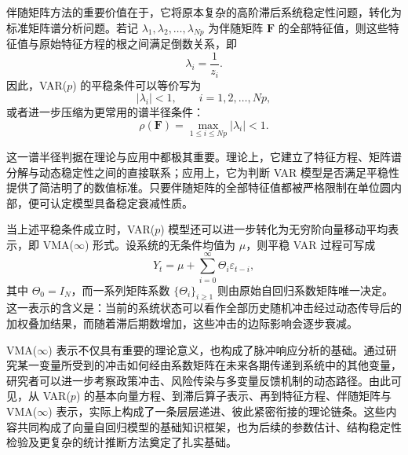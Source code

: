 \documentclass[UTF8,a4paper,12pt]{ctexbook}
\begin{document}
伴随矩阵方法的重要价值在于，它将原本复杂的高阶滞后系统稳定性问题，转化为标准矩阵谱分析问题。若记 $\lambda_1,\lambda_2,\dots,\lambda_{Np}$ 为伴随矩阵 $\mathbf{F}$ 的全部特征值，则这些特征值与原始特征方程的根之间满足倒数关系，即
\begin{equation}
\lambda_i = \frac{1}{z_i}.
\end{equation}
因此，VAR($p$) 的平稳条件可以等价写为
\begin{equation}
|\lambda_i|<1, \qquad i=1,2,\dots,Np,
\end{equation}
或者进一步压缩为更常用的谱半径条件：
\begin{equation}
\rho(\mathbf{F})=\max_{1\leq i\leq Np}|\lambda_i|<1.
\end{equation}

这一谱半径判据在理论与应用中都极其重要。理论上，它建立了特征方程、矩阵谱分解与动态稳定性之间的直接联系；应用上，它为判断 VAR 模型是否满足平稳性提供了简洁明了的数值标准。只要伴随矩阵的全部特征值都被严格限制在单位圆内部，便可认定模型具备稳定衰减性质。

当上述平稳条件成立时，VAR($p$) 模型还可以进一步转化为无穷阶向量移动平均表示，即 VMA($\infty$) 形式。设系统的无条件均值为 $\mu$，则平稳 VAR 过程可写成
\begin{equation}
Y_t = \mu + \sum_{i=0}^{\infty}\Theta_i\varepsilon_{t-i},
\end{equation}
其中 $\Theta_0=I_N$，而一系列矩阵系数 $\{\Theta_i\}_{i\ge 1}$ 则由原始自回归系数矩阵唯一决定。这一表示的含义是：当前的系统状态可以看作全部历史随机冲击经过动态传导后的加权叠加结果，而随着滞后期数增加，这些冲击的边际影响会逐步衰减。

VMA($\infty$) 表示不仅具有重要的理论意义，也构成了脉冲响应分析的基础。通过研究某一变量所受到的冲击如何经由系数矩阵在未来各期传递到系统中的其他变量，研究者可以进一步考察政策冲击、风险传染与多变量反馈机制的动态路径。由此可见，从 VAR($p$) 的基本向量方程、到滞后算子表示、再到特征方程、伴随矩阵与 VMA($\infty$) 表示，实际上构成了一条层层递进、彼此紧密衔接的理论链条。这些内容共同构成了向量自回归模型的基础知识框架，也为后续的参数估计、结构稳定性检验及更复杂的统计推断方法奠定了扎实基础。
\end{document}
